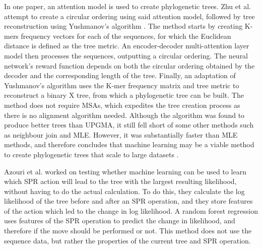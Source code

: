 \documentclass{mpaper}
\begin{document}
In one paper, an attention model is used to create phylogenetic trees. Zhu et al. \cite{zhu2021applying} attempt to create a circular ordering using said attention model, followed by tree reconstruction using Yushmanov's algorithm \cite{yushmanov1984construction}. The method starts by creating K-mers frequency vectors for each of the sequences, for which the Euclidean distance is defined as the tree metric. An encoder-decoder multi-attention layer model then processes the sequences, outputting a circular ordering. The neural network's reward function depends on both the circular ordering obtained by the decoder and the corresponding length of the tree. Finally, an adaptation of Yushmanov's algorithm uses the K-mer frequency matrix and tree metric to reconstruct a binary X tree, from which a phylogenetic tree can be built. The method does not require MSAs, which expedites the tree creation process as there is no alignment algorithm needed. Although the algorithm was found to produce better trees than UPGMA, it still fell short of some other methods such as neighbour join and MLE. However, it was substantially faster than MLE methods, and therefore concludes that machine learning may be a viable method to create phylogenetic trees that scale to large datasets \cite{zhu2021applying}. 

Azouri et al. \cite{bioMLPaper} worked on testing whether machine learning can be used to learn which SPR action will lead to the tree with the largest resulting likelihood, without having to do the actual calculation. To do this, they calculate the log likelihood of the tree before and after an SPR operation, and they store features of the action which led to the change in log likelihood. A random forest regression uses features of the SPR operation to predict the change in likelihood, and therefore if the move should be performed or not. This method does not use the sequence data, but rather the properties of the current tree and SPR operation.
\end{document}
